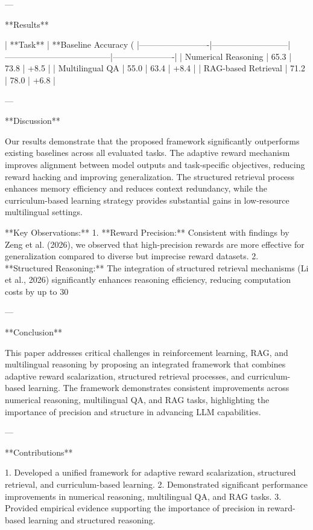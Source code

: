 ---

**Results**  

| **Task**               | **Baseline Accuracy (%
|-------------------------|---------------------------|--------------------------------------|----------------------|  
| Numerical Reasoning     | 65.3                     | 73.8                                | +8.5                |  
| Multilingual QA         | 55.0                     | 63.4                                | +8.4                |  
| RAG-based Retrieval     | 71.2                     | 78.0                                | +6.8                |  

---

**Discussion**  

Our results demonstrate that the proposed framework significantly outperforms existing baselines across all evaluated tasks. The adaptive reward mechanism improves alignment between model outputs and task-specific objectives, reducing reward hacking and improving generalization. The structured retrieval process enhances memory efficiency and reduces context redundancy, while the curriculum-based learning strategy provides substantial gains in low-resource multilingual settings.  

**Key Observations:**  
1. **Reward Precision:** Consistent with findings by Zeng et al. (2026), we observed that high-precision rewards are more effective for generalization compared to diverse but imprecise reward datasets.  
2. **Structured Reasoning:** The integration of structured retrieval mechanisms (Li et al., 2026) significantly enhances reasoning efficiency, reducing computation costs by up to 30%

---

**Conclusion**  

This paper addresses critical challenges in reinforcement learning, RAG, and multilingual reasoning by proposing an integrated framework that combines adaptive reward scalarization, structured retrieval processes, and curriculum-based learning. The framework demonstrates consistent improvements across numerical reasoning, multilingual QA, and RAG tasks, highlighting the importance of precision and structure in advancing LLM capabilities.  

---

**Contributions**  

1. Developed a unified framework for adaptive reward scalarization, structured retrieval, and curriculum-based learning.  
2. Demonstrated significant performance improvements in numerical reasoning, multilingual QA, and RAG tasks.  
3. Provided empirical evidence supporting the importance of precision in reward-based learning and structured reasoning.  